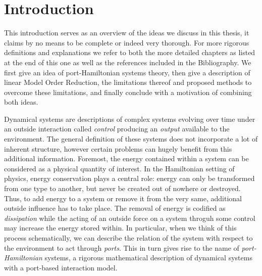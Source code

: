 \chapter{Introduction}

This introduction serves as an overview of the ideas we discuss in this thesis, it claims by no means to be complete or indeed very thorough.
For more rigorous definitions and explanations we refer to both the more detailed chapters as listed at the end of this one as well as the references included in the Bibliography.
We first give an idea of port-Hamiltonian systems theory, then give a description of linear Model Order Reduction, the limitations thereof and proposed methods to overcome these limitations, and finally conclude with a motivation of combining both ideas.

Dynamical systems are descriptions of complex systems evolving over time under an outside interaction called \emph{control} producing an \emph{output} available to the environment.
The general definition of these systems does not incorporate a lot of inherent structure, however certain problems can hugely benefit from this additional information.
Foremost, the energy contained within a system can be considered as a physical quantity of interest.
In the Hamiltonian setting of physics, energy conservation plays a central role: energy can only be transformed from one type to another, but never be created out of nowhere or destroyed.
Thus, to add energy to a system or remove it from the very same, additional outside influence has to take place.
The removal of energy is codified as \emph{dissipation} while the acting of an outside force on a system throguh some control may increase the energy stored within.
In particular, when we think of this process schematically, we can describe the relation of the system with respect to the environment to act through \emph{ports}.
This in turn gives rise to the name of \emph{port-Hamiltonian} systems, a rigorous mathematical description of dynamical systems with a port-based interaction model.


